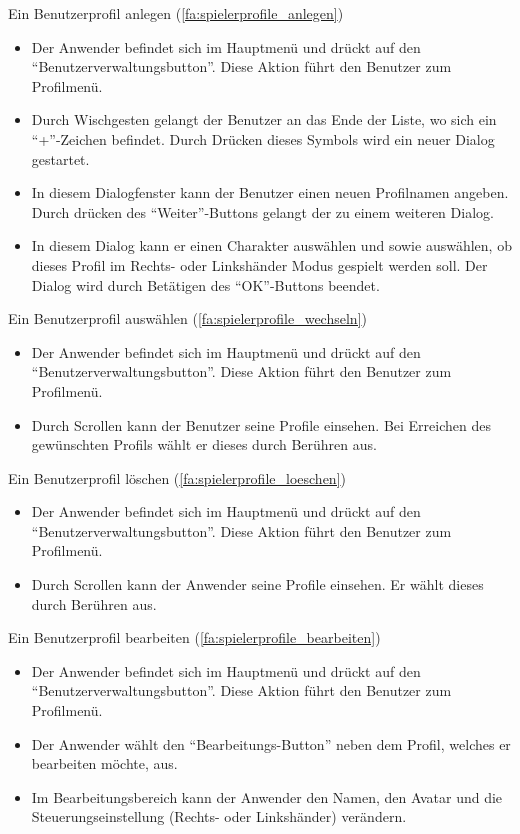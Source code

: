 \documentclass{scrartcl}
\begin{document}
\begin{telist}
	\item Ein Benutzerprofil anlegen (\ref{fa:spielerprofile_anlegen})
	\begin{itemize}
		\item Der Anwender befindet sich im Hauptmenü und drückt auf den \enquote{Benutzerverwaltungsbutton}. Diese Aktion führt den Benutzer zum Profilmenü.
		\item Durch Wischgesten gelangt der Benutzer an das Ende der Liste, wo sich ein \enquote{+}-Zeichen befindet. Durch Drücken dieses Symbols wird ein neuer Dialog gestartet.
		\item In diesem Dialogfenster kann der Benutzer einen neuen Profilnamen angeben. Durch drücken des \enquote{Weiter}-Buttons gelangt der zu einem weiteren Dialog.
		\item In diesem Dialog kann er einen Charakter auswählen und sowie auswählen, ob dieses Profil im Rechts- oder Linkshänder Modus gespielt werden soll. Der Dialog wird durch Betätigen des \enquote{OK}-Buttons beendet.
	\end{itemize}
	
	\item Ein Benutzerprofil auswählen (\ref{fa:spielerprofile_wechseln})
	\begin{itemize}
		\item Der Anwender befindet sich im Hauptmenü und drückt auf den \enquote{Benutzerverwaltungsbutton}. Diese Aktion führt den Benutzer zum Profilmenü.
		\item Durch Scrollen kann der Benutzer seine Profile einsehen. Bei Erreichen des gewünschten Profils wählt er dieses durch Berühren aus.
	\end{itemize}
	
	\item Ein Benutzerprofil löschen (\ref{fa:spielerprofile_loeschen})
	\begin{itemize}
		\item Der Anwender befindet sich im Hauptmenü und drückt auf den \enquote{Benutzerverwaltungsbutton}. Diese Aktion führt den Benutzer zum Profilmenü.
		\item Durch Scrollen kann der Anwender seine Profile einsehen. Er wählt dieses durch Berühren aus. 
	\end{itemize}
	
	\item Ein Benutzerprofil bearbeiten (\ref{fa:spielerprofile_bearbeiten}) \label{test:profilBeartbeiten}
	\begin{itemize}
		\item Der Anwender befindet sich im Hauptmenü und drückt auf den \enquote{Benutzerverwaltungsbutton}. Diese Aktion führt den Benutzer zum Profilmenü.
		\item Der Anwender wählt den \enquote{Bearbeitungs-Button} neben dem Profil, welches er bearbeiten möchte, aus.
		\item Im Bearbeitungsbereich kann der Anwender den Namen, den Avatar und die Steuerungseinstellung (Rechts- oder Linkshänder) verändern.
	\end{itemize}
	

\end{telist}
\end{document}
